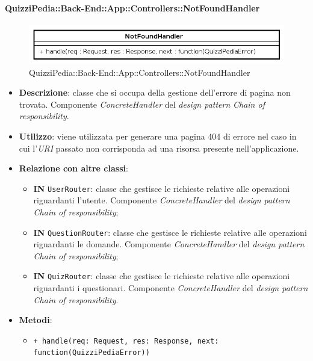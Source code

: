 \paragraph{QuizziPedia::Back-End::App::Controllers::NotFoundHandler}
\label{QuizziPedia::Back-End::App::Controllers::NotFoundHandler}
\begin{figure}[ht]
	\centering
	\includegraphics[scale=0.45]{UML/Package/QuizziPedia_Back-End_App_Controllers_notFoundHandler.png}
	\caption{QuizziPedia::Back-End::App::Controllers::NotFoundHandler}
\end{figure}
\FloatBarrier
\begin{itemize}
	\item \textbf{Descrizione}:
	classe che si occupa della gestione dell'errore di pagina non trovata. Componente \textit{ConcreteHandler} del \textit{design pattern} \textit{Chain of responsibility}.
	\item \textbf{Utilizzo}:
	viene utilizzata per generare una pagina 404 di errore nel caso in cui l'\textit{URI} passato non corrisponda ad una risorsa presente nell'applicazione.
	\item \textbf{Relazione con altre classi}:
	\begin{itemize}
		\item \textbf{IN} \texttt{UserRouter}:
		classe che gestisce le richieste relative alle operazioni riguardanti l'utente. Componente \textit{ConcreteHandler} del \textit{design pattern} \textit{Chain of responsibility};
		\item \textbf{IN} \texttt{QuestionRouter}:
		classe che gestisce le richieste relative alle operazioni riguardanti le domande. Componente \textit{ConcreteHandler} del \textit{design pattern} \textit{Chain of responsibility};
		\item \textbf{IN} \texttt{QuizRouter}:
		classe che gestisce le richieste relative alle operazioni riguardanti i questionari. Componente \textit{ConcreteHandler} del \textit{design pattern} \textit{Chain of responsibility}.
	\end{itemize}
	\item \textbf{Metodi}:
	\begin{itemize}
		\item \texttt{+ handle(req: Request, res: Response, next: function(QuizziPediaError))}\\

\end{itemize}
\end{itemize}
